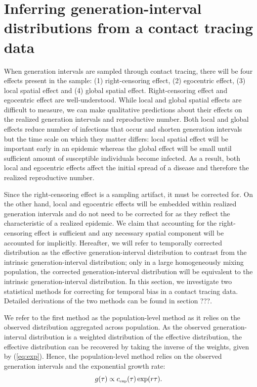 \documentclass[12pt]{article}
\newcommand{\eref}[1]{(\ref{eq:#1})}
\newcommand{\tsub}[2]{#1_{{\textrm{\tiny #2}}}}
\begin{document}
\section{Inferring generation-interval distributions from a contact tracing data}

When generation intervals are sampled through contact tracing, there will be four effects present in the sample: (1) right-censoring effect, (2) egocentric effect, (3) local spatial effect and (4) global spatial effect.
Right-censoring effect and egocentric effect are well-understood.
While local and global spatial effects are difficult to measure, we can make qualitative predictions about their effects on the realized generation intervals and reproductive number. 
Both local and global effects reduce number of infections that occur and shorten generation intervals but the time scale on which they matter differs:
local spatial effect will be important early in an epidemic whereas the global effect will be small until sufficient amount of susceptible individuals become infected.
As a result, both local and egocentric effects affect the initial spread of a disease and therefore the realized reproductive number.

Since the right-censoring effect is a sampling artifact, it must be corrected for.
On the other hand, local and egocentric effects will be embedded within realized generation intervals and do not need to be corrected for as they reflect the characteristic of a realized epidemic.
We claim that accounting for the right-censoring effect is sufficient and any necessary spatial component will be accounted for implicitly.
Hereafter, we will refer to temporally corrected distribution as the effective generation-interval distribution to contrast from the intrinsic generation-interval distribution; only in a large homogeneously mixing population, the corrected generation-interval distribution will be equivalent to the intrinsic generation-interval distribution.
In this section, we investigate two statistical methods for correcting for temporal bias in a contact tracing data.
Detailed derivations of the two methods can be found in section ???.

We refer to the first method as the population-level method as it relies on the  observed distribution aggregated across population.
As the observed generation-interval distribution is a weighted distribution of the effective distribution, the effective distribution can be recovered by taking the inverse of the weights, given by \eref{exp}.
Hence, the population-level method relies on the observed generation intervals and the exponential growth rate:
\begin{equation}
g(\tau) \propto \tsub{c}{exp}(\tau) \exp(r\tau).
\end{equation}
\end{document}
